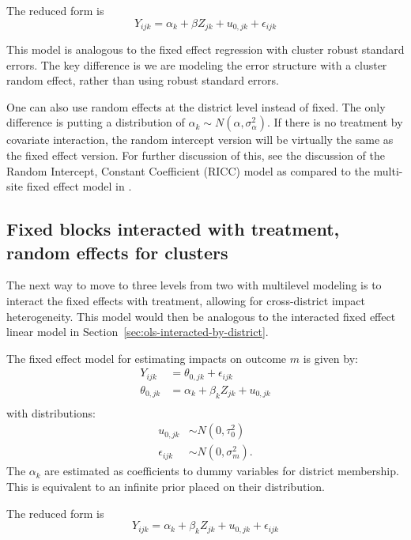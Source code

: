 \documentclass[12pt]{article}
\begin{document}
The reduced form is
\[
Y_{ijk} = \alpha_k + \beta Z_{jk} + u_{0,jk} + \epsilon_{ijk}
\]

This model is analogous to the fixed effect regression with cluster robust standard errors.
The key difference is we are modeling the error structure with a cluster random effect, rather than using robust standard errors.

One can also use random effects at the district level instead of fixed.
The only difference is putting a distribution of $\alpha_k \sim N( \alpha, \sigma^2_\alpha )$.
If there is no treatment by covariate interaction, the random intercept version will be virtually the same as the fixed effect version.
For further discussion of this, see the discussion of the Random Intercept, Constant Coefficient (RICC) model as compared to the multi-site fixed effect model in \cite{miratrix2021applied}.




\subsection{Fixed blocks interacted with treatment, random effects for clusters}
\label{fixed-blocks-random-effects-for-clusters}

The next way to move to three levels from two with multilevel modeling is to interact the fixed effects with treatment, allowing for cross-district impact heterogeneity.
This model would then be analogous to the interacted fixed effect linear model in Section~\ref{sec:ols-interacted-by-district}.

The fixed effect model for estimating impacts on outcome $m$ is given by: \[
\begin{aligned}
Y_{ijk} &=  \theta_{0,jk}  + \epsilon_{ijk}\\
 \theta_{0,jk} &= \alpha_k + \beta_{k} Z_{jk} + u_{0,jk}\\
\end{aligned}
\] with distributions: 
\[
\begin{aligned}
u_{0,jk} &\sim N\left(0, \tau^2_{0}\right)\\
\epsilon_{ijk} &\sim N\left(0, \sigma^2_m\right).
\end{aligned}
\]
The $\alpha_k$ are estimated as coefficients to dummy variables for district membership.
This is equivalent to an infinite prior placed on their distribution.

The reduced form is
\[
Y_{ijk} = \alpha_k  + \beta_k Z_{jk} + u_{0,jk} + \epsilon_{ijk}
\]
\end{document}
